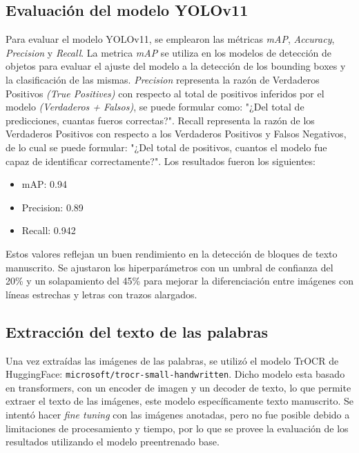 \documentclass[11pt,a4paper]{article}
\begin{document}
\subsection{Evaluación del modelo YOLOv11}
Para evaluar el modelo YOLOv11, se emplearon las métricas \textit{mAP}, \textit{Accuracy}, \textit{Precision} y \textit{Recall}. 
La metrica \textit{mAP} se utiliza en los modelos de detección de objetos para evaluar el ajuste del modelo a la detección de los bounding boxes y la clasificación de las mismas. 
\textit{Precision} representa la razón de Verdaderos Positivos \textit{(True Positives)} con respecto al total de positivos inferidos por el modelo \textit{(Verdaderos + Falsos)}, 
se puede formular como: "¿Del total de predicciones, cuantas fueros correctas?". 
Recall representa la razón de los Verdaderos Positivos con respecto a los Verdaderos Positivos y Falsos Negativos, de lo cual se puede formular: "¿Del total de positivos, cuantos el modelo fue capaz de identificar correctamente?". 
Los resultados fueron los siguientes:

\begin{itemize}
    \item mAP: 0.94
    \item Precision: 0.89
    \item Recall: 0.942
\end{itemize}

Estos valores reflejan un buen rendimiento en la detección de bloques de texto manuscrito. 
Se ajustaron los hiperparámetros con un umbral de confianza del 20\% y un solapamiento del 45\% para mejorar la diferenciación entre imágenes con líneas estrechas y letras con trazos alargados.

\subsection{Extracción del texto de las palabras}
Una vez extraídas las imágenes de las palabras, se utilizó el modelo TrOCR de HuggingFace: \texttt{microsoft/trocr-small-handwritten}. 
Dicho modelo esta basado en transformers, con un encoder de imagen y un decoder de texto, lo que permite extraer el texto de las imágenes, este modelo específicamente texto manuscrito.
Se intentó hacer \textit{fine tuning} con las imágenes anotadas, pero no fue posible debido a limitaciones de procesamiento y tiempo, por lo que se provee la evaluación de los resultados utilizando el modelo preentrenado base.
\end{document}
